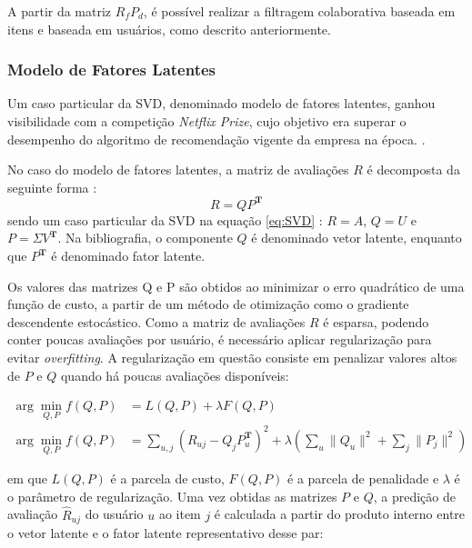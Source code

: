 A partir da matriz $R_{f}P_{d}$, é possível realizar a filtragem colaborativa
baseada em itens e baseada em usuários, como descrito anteriormente.

\subsubsection{Modelo de Fatores Latentes}
Um caso particular da SVD, denominado modelo de fatores latentes, ganhou
visibilidade com a competição \textit{Netflix Prize}, cujo objetivo era superar
o desempenho do algoritmo de recomendação vigente da empresa na época.
\cite{lessons_netflix_prize}.

No caso do modelo de fatores latentes, a matriz de avaliações $R$ é decomposta
da seguinte forma \cite{aggarwal2016recommender}:
\begin{equation}
    R = QP^{\mathbf{T}}
\end{equation}
sendo um caso particular da SVD na equação \ref{eq:SVD} : $R = A$, $Q = U$ e $P = \Sigma V^{\mathbf{T}}$.
Na bibliografia, o componente $Q$ é denominado vetor latente, enquanto que
$P^{\mathbf{T}}$ é denominado fator latente.

Os valores das matrizes Q e P são obtidos ao minimizar o erro quadrático de uma
função de custo, a partir de um método de otimização como o gradiente
descendente estocástico. Como a matriz de avaliações $R$ é esparsa,
podendo conter poucas avaliações por usuário, é necessário aplicar regularização
para evitar \textit{overfitting}. A regularização em questão consiste em
penalizar valores altos de $P$ e $Q$ quando há poucas avaliações disponíveis:

\begin{align}
    \arg\min_{Q,P} f(Q,P) &= L(Q,P) + \lambda F(Q,P) \\
    \arg\min_{Q,P} f(Q,P) &= \sum_{u,j} (R_{uj} - Q_j P_u^{\mathbf{T}})^2 + \lambda (\sum_u \|Q_u\|^2 + \sum_j \|P_j\|^2)
\end{align}

em que $L(Q,P)$ é a parcela de custo, $F(Q,P)$ é a parcela de penalidade e
$\lambda$ é o parâmetro de regularização. Uma vez obtidas as matrizes $P$ e $Q$,
a predição de avaliação $\hat{R}_{uj}$ do usuário $u$ ao item $j$ é calculada a
partir do produto interno entre o vetor latente e o fator latente representativo
desse par:

